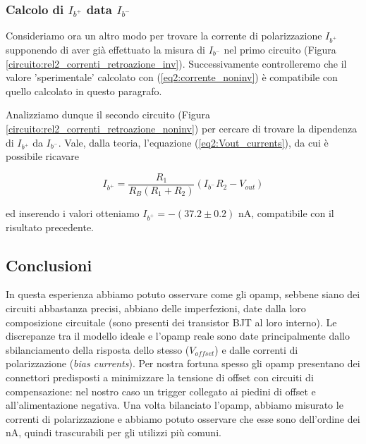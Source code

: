 \subsubsection*{Calcolo di $I_{b^+}$ data $I_{b^-}$}

Consideriamo ora un altro modo per trovare la corrente di polarizzazione $I_{b^+}$ supponendo di aver già effettuato la misura di $I_{b^-}$ nel primo circuito (Figura \ref{circuito:rel2_correnti_retroazione_inv}). Successivamente controlleremo che il valore 'sperimentale' calcolato con (\ref{eq2:corrente_noninv}) è compatibile con quello calcolato in questo paragrafo.

Analizziamo dunque il secondo circuito (Figura \ref{circuito:rel2_correnti_retroazione_noninv}) per cercare di trovare la dipendenza di $I_{b^+}$ da $I_{b^-}$. Vale, dalla teoria, l'equazione (\ref{eq2:Vout_currents}), da cui è possibile ricavare

$$I_{b^+} = \frac{R_1}{R_B(R_1+R_2)}(I_{b^-} R_2-V_{out})$$

ed inserendo i valori otteniamo $I_{b^+} = - (37.2 \pm 0.2)$ \si{\nano\ampere}, compatibile con il risultato precedente.

\subsection*{Conclusioni}
In questa esperienza abbiamo potuto osservare come gli opamp, sebbene siano dei circuiti abbastanza precisi, abbiano delle imperfezioni, date dalla loro composizione circuitale (sono presenti dei transistor BJT al loro interno).
Le discrepanze tra il modello ideale e l'opamp reale sono date principalmente dallo sbilanciamento della risposta dello stesso ($V_{offset}$) e dalle correnti di polarizzazione (\textit{bias currents}).
Per nostra fortuna spesso gli opamp presentano dei connettori predisposti a minimizzare la tensione di offset con circuiti di compensazione: nel nostro caso un trigger collegato ai piedini di offset e all'alimentazione negativa.
Una volta bilanciato l'opamp, abbiamo misurato le correnti di polarizzazione e abbiamo potuto osservare che esse sono dell'ordine dei \si{\nano\ampere}, quindi trascurabili per gli utilizzi più comuni.
